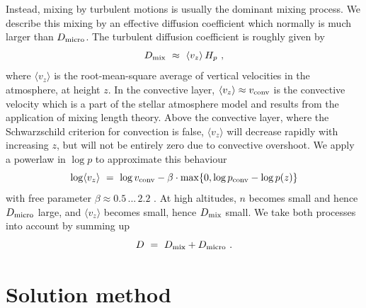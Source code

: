 \documentclass[11pt]{article}
\begin{document}
Instead, mixing by turbulent motions is usually the dominant mixing
process. We describe this mixing by an effective diffusion
coefficient which normally is much larger than $D_{\rm micro}$. The
turbulent diffusion coefficient is roughly given by
\begin{equation}
  D_{\rm mix} ~\approx~ \langle v_z\rangle\,H_p \ ,
\end{equation} 
where $\langle v_z\rangle$ is the root-mean-square average of vertical
velocities in the atmosphere, at height $z$. In the convective layer,
$\langle v_z\rangle\approx v_{\rm conv}$ is the convective velocity
which is a part of the stellar atmosphere model and results from the
application of mixing length theory.  Above the convective layer,
where the Schwarzschild criterion for convection is false, $\langle
v_z\rangle$ will decrease rapidly with increasing $z$, but will not be
entirely zero due to convective overshoot. We apply a powerlaw in
$\log p$ to approximate this behaviour
\begin{equation}
  \log \langle v_z\rangle ~=~ \log v_{\rm conv} 
                          - \beta\cdot\max\{0,\log p_{\rm conv}-\log p(z)\}
\end{equation}
with free parameter $\beta\approx 0.5\,...\,2.2$ \citep{Ludwig2002,Lee2015}.
At high altitudes, $n$ becomes small and hence $D_{\rm micro}$ large,
and $\langle v_z\rangle$ becomes small, hence $D_{\rm mix}$ small.
We take both processes into account by summing up 
\begin{equation}
  D ~=~ D_{\rm mix} + D_{\rm micro} \ .
\end{equation}

\section{Solution method}
\end{document}
